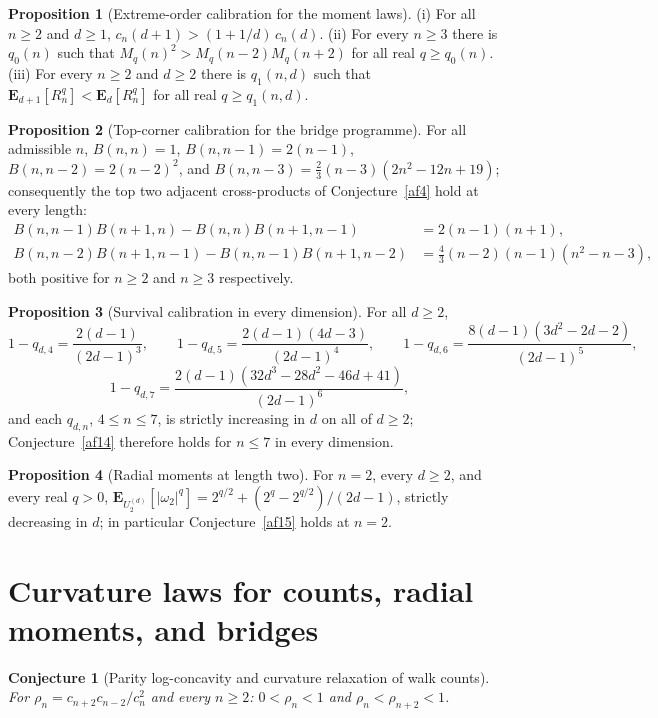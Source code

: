 \documentclass[11pt]{article}
\newtheorem{conjecture}{Conjecture}
\theoremstyle{definition}
\newtheorem{proposition}{Proposition}
\begin{document}
\begin{proposition}[Extreme-order calibration for the moment laws]\label{af:extreme}
(i) For all $n\ge2$ and $d\ge1$, $c_n(d+1)>(1+1/d)\,c_n(d)$.  (ii) For every $n\ge3$ there is $q_0(n)$ such that $M_q(n)^2>M_q(n-2)M_q(n+2)$ for all real $q\ge q_0(n)$.  (iii) For every $n\ge2$ and $d\ge2$ there is $q_1(n,d)$ such that $\mathbf E_{d+1}[R_n^q]<\mathbf E_d[R_n^q]$ for all real $q\ge q_1(n,d)$.
\end{proposition}

\begin{proposition}[Top-corner calibration for the bridge programme]\label{af:height}
For all admissible $n$, $B(n,n)=1$, $B(n,n-1)=2(n-1)$, $B(n,n-2)=2(n-2)^2$, and $B(n,n-3)=\tfrac23(n-3)(2n^2-12n+19)$; consequently the top two adjacent cross-products of Conjecture~\ref{af4} hold at every length:
\begin{align*}
B(n,n{-}1)B(n{+}1,n)-B(n,n)B(n{+}1,n{-}1)&=2(n-1)(n+1),\\
B(n,n{-}2)B(n{+}1,n{-}1)-B(n,n{-}1)B(n{+}1,n{-}2)&=\tfrac43(n-2)(n-1)(n^2-n-3),
\end{align*}
both positive for $n\ge2$ and $n\ge3$ respectively.
\end{proposition}

\begin{proposition}[Survival calibration in every dimension]\label{af:nbw}
For all $d\ge2$,
\[
1-q_{d,4}=\frac{2(d-1)}{(2d-1)^3},\qquad
1-q_{d,5}=\frac{2(d-1)(4d-3)}{(2d-1)^4},\qquad
1-q_{d,6}=\frac{8(d-1)(3d^2-2d-2)}{(2d-1)^5},
\]
\[
1-q_{d,7}=\frac{2(d-1)(32d^3-28d^2-46d+41)}{(2d-1)^6},
\]
and each $q_{d,n}$, $4\le n\le7$, is strictly increasing in $d$ on all of $d\ge2$; Conjecture~\ref{af14} therefore holds for $n\le7$ in every dimension.
\end{proposition}

\begin{proposition}[Radial moments at length two]\label{af:rad2}
For $n=2$, every $d\ge2$, and every real $q>0$, $\mathbf E_{U_2^{(d)}}[|\omega_2|^q]=2^{q/2}+(2^q-2^{q/2})/(2d-1)$, strictly decreasing in $d$; in particular Conjecture~\ref{af15} holds at $n=2$.
\end{proposition}

\section{Curvature laws for counts, radial moments, and bridges}

\begin{conjecture}[Parity log-concavity and curvature relaxation of walk counts]\label{af1}
For $\rho_n=c_{n+2}c_{n-2}/c_n^2$ and every $n\ge2$: $0<\rho_n<1$ and $\rho_n<\rho_{n+2}<1$.
\end{conjecture}
\end{document}

